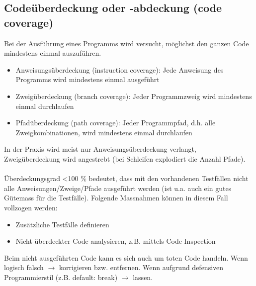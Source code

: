 \subsection{Codeüberdeckung oder -abdeckung (code coverage)}
Bei der Ausführung eines Programms wird versucht, möglichst den ganzen
Code mindestens einmal auszuführen.
\begin{itemize}
    \item Anweisungsüberdeckung (instruction coverage): Jede Anweisung des Programms wird mindestens einmal ausgeführt
    \item Zweigüberdeckung (branch coverage): Jeder Programmzweig wird mindestens einmal durchlaufen
    \item Pfadüberdeckung (path coverage): Jeder Programmpfad, d.h. alle Zweigkombinationen, wird mindestens einmal durchlaufen
\end{itemize}
In der Praxis wird meist nur Anweisungsüberdeckung verlangt,
Zweigüberdeckung wird angestrebt (bei Schleifen explodiert die Anzahl Pfade).\\\\
Überdeckungsgrad \textless 100 \% bedeutet, dass mit den vorhandenen Testfällen nicht alle Anweisungen/Zweige/Pfade ausgeführt werden (ist u.a. auch ein gutes Gütemass für die Testfälle). Folgende Massnahmen können in diesem Fall vollzogen werden:
\begin{itemize}
    \item Zusätzliche Testfälle definieren
    \item Nicht überdeckter Code analysieren, z.B. mittels Code Inspection
\end{itemize}
Beim nicht ausgeführten Code kann es sich auch um toten Code handeln. Wenn logisch falsch $\rightarrow$ korrigieren bzw. entfernen. Wenn aufgrund defensiven Programmierstil (z.B. default: break) $\rightarrow$ lassen.

